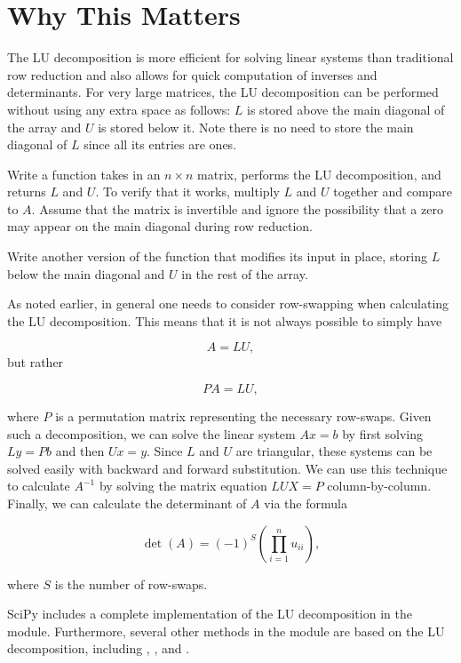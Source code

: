 \section*{Why This Matters}
The LU decomposition is more efficient for solving linear systems than traditional row reduction and also allows for quick computation of inverses and determinants. For very large matrices, the LU decomposition can be performed without using any extra space as follows: $L$ is stored above the main diagonal of the array and $U$ is  stored below it.
Note there is no need to store the main diagonal of $L$ since all its entries are ones.

\begin{problem}
\label{prob:LU}
Write a function takes in an $n\times n$ matrix, performs the LU decomposition, and returns $L$ and $U$.
To verify that it works, multiply $L$ and $U$ together and compare to $A$.
Assume that the matrix is invertible and ignore the possibility that a zero may appear on the main diagonal during row reduction.

Write another version of the function that modifies its input in place, storing $L$ below the main diagonal and $U$ in the rest of the array.
\end{problem}

As noted earlier, in general one needs to consider row-swapping when
calculating the LU decomposition. This means that it is not always possible to simply have

\[
A = LU,
\]
but rather

\[
PA = LU,
\]

where $P$ is a permutation matrix representing the necessary row-swaps. Given such a decomposition, we can solve the linear system $Ax = b$ by
first solving $Ly = Pb$ and then $Ux = y$. Since $L$ and $U$ are triangular, these systems can be solved easily with backward and forward substitution. We can use this technique to calculate $A^{-1}$ by solving the matrix equation $LUX = P$ column-by-column. Finally, we can calculate the determinant of $A$ via the formula

\[
\det(A) = (-1)^S\left(\displaystyle\prod_{i=1}^nu_{ii}\right),
\]

where $S$ is the number of row-swaps.

SciPy includes a complete implementation of the LU decomposition in the  module. Furthermore, several other methods in the  module are based on the LU decomposition, including , , and .

